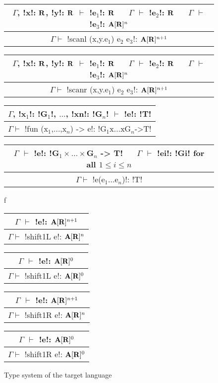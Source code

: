 \begin{figure*}[tb]
    \centering

    \begin{tabular}{c}
        $\Gamma$, !x!: $\mathbf{R}$, !y!: $\mathbf{R}$ $\vdash$ !e$_1$!: $\mathbf{R}$ 
        $\quad$ $\Gamma$ $\vdash$ !e$_2$!: $\mathbf{R}$
        $\quad$ $\Gamma$ $\vdash$ !e$_3$!: $\mathbf{A}[\mathbf{R}]^{n}$
        \\\hline  
        $\Gamma \vdash$ !scanl (x,y.e$_1$) e$_2$ e$_3$!: $\mathbf{A}[\mathbf{R}]^{n+1}$
    \end{tabular}

    \begin{tabular}{c}
        $\Gamma$, !x!: $\mathbf{R}$, !y!: $\mathbf{R}$ $\vdash$ !e$_1$!: $\mathbf{R}$ 
        $\quad$ $\Gamma$ $\vdash$ !e$_2$!: $\mathbf{R}$
        $\quad$ $\Gamma$ $\vdash$ !e$_3$!: $\mathbf{A}[\mathbf{R}]^{n}$
        \\\hline  
        $\Gamma \vdash$ !scanr (x,y.e$_1$) e$_2$ e$_3$!: $\mathbf{A}[\mathbf{R}]^{n+1}$
    \end{tabular}

    \begin{tabular}{c}
        $\Gamma$, !x$_1$!: !G$_1$!, $\ldots$, !xn!: !G$_n$! $\vdash$ !e!: !T! 
        \\\hline  
        $\Gamma \vdash$ !fun (x$_1$,$\ldots$,x$_n$) -> e!: !G$_1$x...xG$_n$->T!
    \end{tabular}

    \begin{tabular}{c}
        $\Gamma$ $\vdash$ !e!: !G$_1\times\ldots\times$G$_n$ -> T!
        $\quad$ $\Gamma$ $\vdash$ !ei!: !Gi! for all $1\leq i\leq n$
        \\\hline  
        $\Gamma \vdash$ !e(e$_1\ldots$e$_n$)!: !T!
    \end{tabular}f

    \begin{tabular}{c}
        $\Gamma$ $\vdash$ !e!: $\mathbf{A}[\mathbf{R}]^{n+1}$
        \\\hline  
        $\Gamma \vdash$ !shift1L e!: $\mathbf{A}[\mathbf{R}]^{n}$
    \end{tabular}
    \hspace{0.5cm}
    \begin{tabular}{c}
        $\Gamma$ $\vdash$ !e!: $\mathbf{A}[\mathbf{R}]^{0}$
        \\\hline  
        $\Gamma \vdash$ !shift1L e!: $\mathbf{A}[\mathbf{R}]^{0}$
    \end{tabular}

    \begin{tabular}{c}
        $\Gamma$ $\vdash$ !e!: $\mathbf{A}[\mathbf{R}]^{n+1}$
        \\\hline  
        $\Gamma \vdash$ !shift1R e!: $\mathbf{A}[\mathbf{R}]^{n}$
    \end{tabular}
    \hspace{0.5cm}
    \begin{tabular}{c}
        $\Gamma$ $\vdash$ !e!: $\mathbf{A}[\mathbf{R}]^{0}$
        \\\hline  
        $\Gamma \vdash$ !shift1R e!: $\mathbf{A}[\mathbf{R}]^{0}$
    \end{tabular}

    \vspace{-0.2cm}
    \caption{Type system of the target language}
    \vspace{-0.4cm}
    \label{fig:target_typesystem}
    \end{figure*}